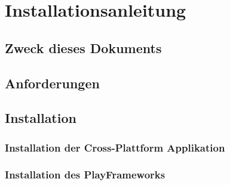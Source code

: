 \section{Installationsanleitung}

\subsection{Zweck dieses Dokuments}
\subsection{Anforderungen}

\subsection{Installation}

\subsubsection*{Installation der Cross-Plattform Applikation}
\label{subsub:installation}

\subsubsection*{Installation des PlayFrameworks}